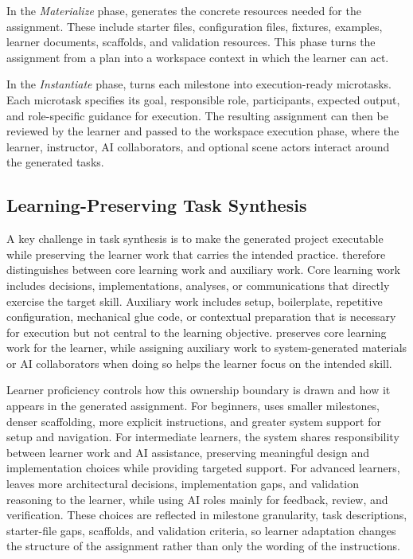 In the \textit{Materialize} phase, \model generates the concrete resources needed for the assignment.
These include starter files, configuration files, fixtures, examples, learner documents, scaffolds, and validation resources.
This phase turns the assignment from a plan into a workspace context in which the learner can act.

In the \textit{Instantiate} phase, \model turns each milestone into execution-ready microtasks.
Each microtask specifies its goal, responsible role, participants, expected output, and role-specific guidance for execution.
The resulting assignment can then be reviewed by the learner and passed to the workspace execution phase, where the learner, instructor, AI collaborators, and optional scene actors interact around the generated tasks.

\subsection{Learning-Preserving Task Synthesis}

A key challenge in task synthesis is to make the generated project executable while preserving the learner work that carries the intended practice.
\model therefore distinguishes between core learning work and auxiliary work.
Core learning work includes decisions, implementations, analyses, or communications that directly exercise the target skill.
Auxiliary work includes setup, boilerplate, repetitive configuration, mechanical glue code, or contextual preparation that is necessary for execution but not central to the learning objective.
\model preserves core learning work for the learner, while assigning auxiliary work to system-generated materials or AI collaborators when doing so helps the learner focus on the intended skill.

Learner proficiency controls how this ownership boundary is drawn and how it appears in the generated assignment.
For beginners, \model uses smaller milestones, denser scaffolding, more explicit instructions, and greater system support for setup and navigation.
For intermediate learners, the system shares responsibility between learner work and AI assistance, preserving meaningful design and implementation choices while providing targeted support.
For advanced learners, \model leaves more architectural decisions, implementation gaps, and validation reasoning to the learner, while using AI roles mainly for feedback, review, and verification.
These choices are reflected in milestone granularity, task descriptions, starter-file gaps, scaffolds, and validation criteria, so learner adaptation changes the structure of the assignment rather than only the wording of the instructions.

